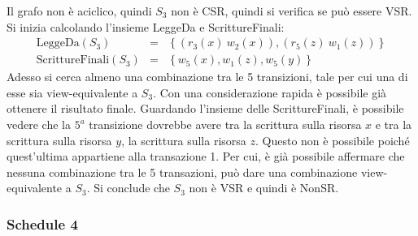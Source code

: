 \documentclass[a4paper]{article}
\begin{document}
	\noindent
	Il grafo non è aciclico, quindi $S_{3}$ non è CSR, quindi si verifica se può essere VSR. Si inizia calcolando l'insieme LeggeDa e ScrittureFinali:
	\begin{equation*}
		\begin{array}{lll}
			\text{LeggeDa}\left(S_{3}\right) &=& \left\{ \left(r_{3}\left(x\right) \: w_{2}\left(x\right)\right), \left(r_{5}\left(z\right) \: w_{1}\left(z\right)\right)\right\} \\
			\text{ScrittureFinali}\left(S_{3}\right) &=& \left\{w_{5}\left(x\right), w_{1}\left(z\right), w_{5}\left(y\right)\right\}
		\end{array}
	\end{equation*}
	Adesso si cerca almeno una combinazione tra le 5 transizioni, tale per cui una di esse sia view-equivalente a $S_{3}$. Con una considerazione rapida è possibile già ottenere il risultato finale. Guardando l'insieme delle ScrittureFinali, è possibile vedere che la $5^{a}$ transizione dovrebbe avere tra la scrittura sulla risorsa $x$ e tra la scrittura sulla risorsa $y$, la scrittura sulla risorsa $z$. Questo non è possibile poiché quest'ultima appartiene alla transazione 1. Per cui, è già possibile affermare che nessuna combinazione tra le 5 transazioni, può dare una combinazione view-equivalente a $S_{3}$. Si conclude che $S_{3}$ non è VSR e quindi è NonSR.
	
	\subsubsection{Schedule 4}
	
\end{document}
